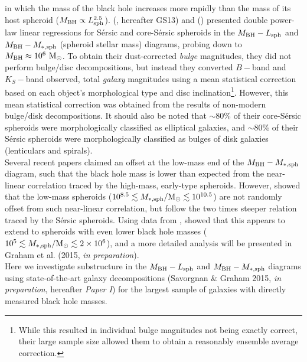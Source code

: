 \documentclass[preprint2]{emulateapj}
\begin{document}
in which the mass of the black hole increases more rapidly than the mass of its host spheroid ($M_{\rm BH} \propto L_{\rm sph}^{2.5}$). 
\citeauthor{grahamscott2013} (\citeyear{grahamscott2013}, hereafter GS13) and \citeauthor{scott2013} (\citeyear{scott2013}) 
presented double power-law linear regressions 
for S\'ersic and core-S\'ersic spheroids in the $M_{\rm BH} - L_{\rm sph}$ and $M_{\rm BH} - M_{\rm *,sph}$ 
(spheroid stellar mass) diagrams, probing down to $M_{\rm BH} \approx 10^6\rm~M_\odot$. 
To obtain their dust-corrected \emph{bulge} magnitudes, they did not perform bulge/disc decompositions, 
but instead they converted $B-$band and $K_S-$band observed, total \emph{galaxy} magnitudes 
using a mean statistical correction based on each object's morphological type and disc 
inclination\footnote{While this resulted in individual bulge magnitudes not being exactly correct, 
their large sample size allowed them to obtain a reasonably ensemble average correction.}. 
However, this mean statistical correction was obtained from the results of non-modern bulge/disk decompositions. 
It should also be noted that $\sim$80\% of their core-S\'ersic spheroids were morphologically classified as elliptical galaxies, 
and $\sim$80\% of their S\'ersic spheroids were morphologically classified as bulges of disk galaxies (lenticulars and spirals). \\
Several recent papers \citep{jiang2011a,jiang2013,mathur2012,reines2013} claimed an offset at the low-mass end of the $M_{\rm BH} - M_{\rm *,sph}$ diagram,
such that the black hole mass is lower than expected from the near-linear correlation traced by the high-mass, early-type spheroids. 
However, \cite{grahamscott2013} showed that the low-mass spheroids ($10^{8.5} \lesssim M_{\rm *,sph}/{\rm M_\odot} \lesssim 10^{10.5}$) 
are not randomly offset from such near-linear correlation, 
but follow the two times steeper relation traced by the S\'ersic spheroids. 
Using data from \cite{jiang2011a}, \cite{grahamscott2015} showed that this appears to extend to spheroids with even lower black hole masses 
($10^{5} \lesssim M_{\rm *,sph}/{\rm M_\odot} \lesssim 2 \times 10^{6}$), 
and a more detailed analysis will be presented in Graham et al. (2015, \emph{in preparation}).  \\
Here we investigate substructure in the $M_{\rm BH} - L_{\rm sph}$ and $M_{\rm BH} - M_{\rm *,sph}$ diagrams 
using state-of-the-art galaxy decompositions (Savorgnan \& Graham 2015, \emph{in preparation}, hereafter \emph{Paper I}) 
for the largest sample of galaxies with directly measured black hole masses.
\end{document}
